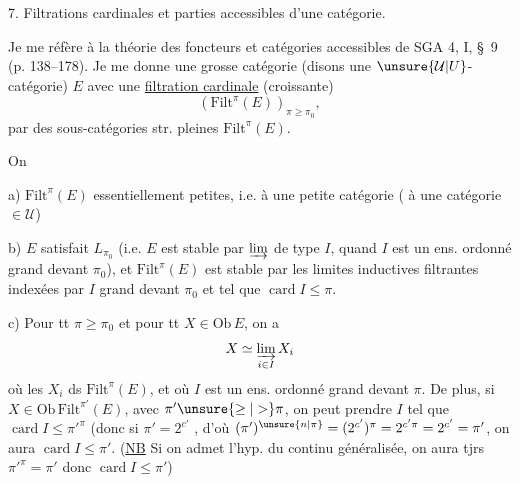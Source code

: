 7. Filtrations cardinales et parties accessibles d'une  catégorie.

Je me réfère à la théorie des foncteurs et catégories accessibles de SGA 4, I, \S\ 9 (p. 138--178). Je me donne une grosse catégorie (disons une $\unsure{\mathcal U|U}$-catégorie) $E$ avec une \uline{filtration cardinale} (croissante)
\[
(\mathrm{Filt}^{\pi}(E))_{\pi\geq\pi_0},
\]
par des sous-catégories str. pleines $\mathrm{Filt}^{\pi}(E)$.

On 

a) $\mathrm{Filt}^{\pi}(E)$  essentiellement petites, i.e.  à une petite catégorie ( à une catégorie $\in\mathcal U$)

b) $E$ satisfait $L_{\pi_0}$ (i.e. $E$ est stable par $\varinjlim$ de type $I$, quand $I$ est un ens. ordonné grand devant $\pi_0$), et $\mathrm{Filt}^{\pi}(E)$ est stable par les limites inductives filtrantes indexées par $I$ grand devant $\pi_0$ et tel que $\operatorname{card}I\leq\pi$.

c) Pour tt $\pi\geq\pi_0$ et pour tt $X\in\mathrm{Ob}\,E$, on a
\[
X\simeq\varinjlim_{i\in I}X_i
\]
où les $X_i$ ds $\mathrm{Filt}^{\pi}(E)$, et où $I$ est un ens. ordonné grand devant $\pi$.
De plus, si $X\in\mathrm{Ob}\,\mathrm{Filt}^{\pi'}(E)$, avec $\pi'\unsure{\geq|>}\pi$, on peut prendre $I$ tel que $\operatorname{card}I\leq\pi'^{\pi}$ (donc si $\pi'=2^{c'}$ , d'où $(\pi')^{\unsure{n|\pi}}=(2^{c'})^{\pi}=2^{c'\pi}=2^{c'}=\pi'$, on aura $\operatorname{card}I\leq\pi'$. (\uline{NB} Si on admet l'hyp. du continu généralisée, on aura tjrs  $\pi'^{\pi}=\pi'$ donc $\operatorname{card}I\leq\pi'$)

